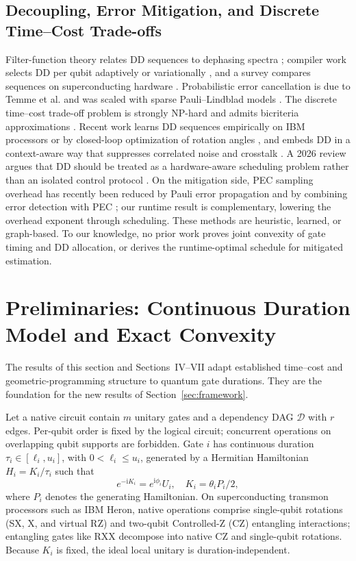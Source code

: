 \documentclass[10pt,letterpaper,journal]{IEEEtran}
\begin{document}
\subsection{Decoupling, Error Mitigation, and Discrete Time--Cost Trade-offs}
Filter-function theory relates DD sequences to dephasing spectra \cite{uhrig,cywinski,biercuk}; compiler work selects DD per qubit adaptively \cite{adapt} or variationally \cite{vaqem}, and a survey compares sequences on superconducting hardware \cite{ezzell}. Probabilistic error cancellation is due to Temme et al. \cite{temme} and was scaled with sparse Pauli--Lindblad models \cite{vandenberg}. The discrete time--cost trade-off problem is strongly NP-hard \cite{de1997} and admits bicriteria approximations \cite{skutella}. Recent work learns DD sequences empirically on IBM processors \cite{tong2024} or by closed-loop optimization of rotation angles \cite{rahman2024}, and embeds DD in a context-aware way that suppresses correlated noise and crosstalk \cite{seif2024,coote2024,brown2024}. A 2026 review argues that DD should be treated as a hardware-aware scheduling problem rather than an isolated control protocol \cite{li2026}. On the mitigation side, PEC sampling overhead has recently been reduced by Pauli error propagation \cite{scheiber2025} and by combining error detection with PEC \cite{fischer2026}; our runtime result is complementary, lowering the overhead exponent through scheduling. These methods are heuristic, learned, or graph-based. To our knowledge, no prior work proves joint convexity of gate timing and DD allocation, or derives the runtime-optimal schedule for mitigated estimation.

\section{Preliminaries: Continuous Duration Model and Exact Convexity}
The results of this section and Sections~IV--VII adapt established time--cost and geometric-programming structure \cite{kelley,fulkerson,boydgp,boyddigital} to quantum gate durations. They are the foundation for the new results of Section~\ref{sec:framework}.

Let a native circuit contain $m$ unitary gates and a dependency DAG $\mathcal{D}$ with $r$ edges. Per-qubit order is fixed by the logical circuit; concurrent operations on overlapping qubit supports are forbidden. Gate $i$ has continuous duration $\tau_i \in [\ell_i, u_i]$, with $0 < \ell_i \le u_i$, generated by a Hermitian Hamiltonian $H_i = K_i / \tau_i$ such that
\begin{equation}
e^{-\mathrm{i}K_i} = e^{\mathrm{i}\phi_i}U_i, \quad K_i = \theta_i P_i / 2,
\end{equation}
where $P_i$ denotes the generating Hamiltonian. On superconducting transmon processors such as IBM Heron, native operations comprise single-qubit rotations (SX, X, and virtual RZ) and two-qubit Controlled-Z (CZ) entangling interactions; entangling gates like RXX decompose into native CZ and single-qubit rotations. Because $K_i$ is fixed, the ideal local unitary is duration-independent.
\end{document}

